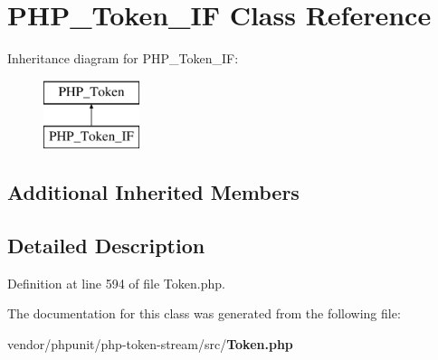 \section{P\+H\+P\+\_\+\+Token\+\_\+\+I\+F Class Reference}
\label{class_p_h_p___token___i_f}
Inheritance diagram for P\+H\+P\+\_\+\+Token\+\_\+\+I\+F\+:\begin{figure}[H]
\begin{center}
\leavevmode
\includegraphics[height=2.000000cm]{class_p_h_p___token___i_f}
\end{center}
\end{figure}
\subsection*{Additional Inherited Members}


\subsection{Detailed Description}


Definition at line 594 of file Token.\+php.



The documentation for this class was generated from the following file\+:\begin{DoxyCompactItemize}
\item 
vendor/phpunit/php-\/token-\/stream/src/{\bf Token.\+php}\end{DoxyCompactItemize}
